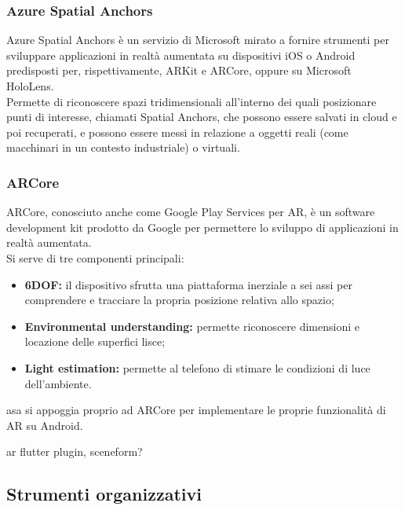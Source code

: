 \subsubsection{Azure Spatial Anchors}
Azure Spatial Anchors è un servizio di Microsoft mirato a fornire strumenti per sviluppare applicazioni in realtà aumentata su dispositivi iOS o Android predisposti per, rispettivamente, ARKit e ARCore, oppure su Microsoft HoloLens.\\
Permette di riconoscere spazi tridimensionali all'interno dei quali posizionare punti di interesse, chiamati Spatial Anchors, che possono essere salvati in cloud e poi recuperati, e possono essere messi in relazione a oggetti reali (come macchinari in un contesto industriale) o virtuali.

\subsubsection{ARCore}
ARCore, conosciuto anche come Google Play Services per AR, è un software development kit prodotto da Google per permettere lo sviluppo di applicazioni in realtà aumentata.\\
Si serve di tre componenti principali:
\begin{itemize}
    \item \textbf{6DOF:} il dispositivo sfrutta una piattaforma inerziale a sei assi per comprendere e tracciare la propria posizione relativa allo spazio;
    \item \textbf{Environmental understanding:} permette riconoscere dimensioni e locazione delle superfici lisce;
    \item \textbf{Light estimation:} permette al telefono di stimare le condizioni di luce dell'ambiente.
\end{itemize}
asa si appoggia proprio ad ARCore per implementare le proprie funzionalità di AR su Android.

\todo
\textcolor{todoOrange}{ar flutter plugin, sceneform?}


\subsection{Strumenti organizzativi}


